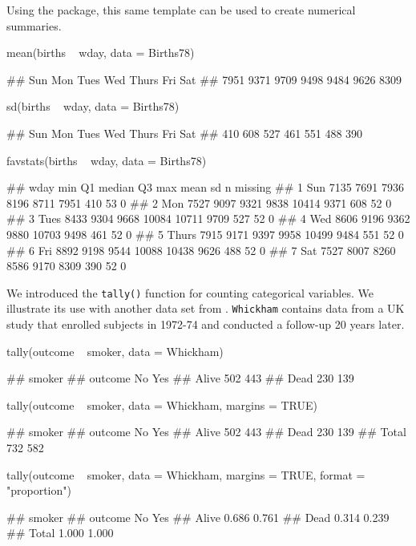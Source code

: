 \noindent
Using the  package, this same template can be used to create
numerical summaries.

\begin{Schunk}
\begin{Sinput}
mean(births ~ wday, data = Births78)
\end{Sinput}
\begin{Soutput}
##   Sun   Mon  Tues   Wed Thurs   Fri   Sat 
##  7951  9371  9709  9498  9484  9626  8309
\end{Soutput}
\begin{Sinput}
sd(births ~ wday, data = Births78)
\end{Sinput}
\begin{Soutput}
##   Sun   Mon  Tues   Wed Thurs   Fri   Sat 
##   410   608   527   461   551   488   390
\end{Soutput}
\begin{Sinput}
favstats(births ~ wday, data = Births78)
\end{Sinput}
\begin{Soutput}
##    wday  min   Q1 median    Q3   max mean  sd  n missing
## 1   Sun 7135 7691   7936  8196  8711 7951 410 53       0
## 2   Mon 7527 9097   9321  9838 10414 9371 608 52       0
## 3  Tues 8433 9304   9668 10084 10711 9709 527 52       0
## 4   Wed 8606 9196   9362  9880 10703 9498 461 52       0
## 5 Thurs 7915 9171   9397  9958 10499 9484 551 52       0
## 6   Fri 8892 9198   9544 10088 10438 9626 488 52       0
## 7   Sat 7527 8007   8260  8586  9170 8309 390 52       0
\end{Soutput}
\end{Schunk}

\noindent
We introduced the \texttt{tally()} function for counting categorical
variables. We illustrate its use with another data set from
 \citep{mosaicData}. \texttt{Whickham} contains data
from a UK study that enrolled subjects in 1972-74 and conducted a
follow-up 20 years later.

\begin{Schunk}
\begin{Sinput}
tally(outcome ~ smoker, data = Whickham)
\end{Sinput}
\begin{Soutput}
##        smoker
## outcome  No Yes
##   Alive 502 443
##   Dead  230 139
\end{Soutput}
\begin{Sinput}
tally(outcome ~ smoker, data = Whickham, margins = TRUE)
\end{Sinput}
\begin{Soutput}
##        smoker
## outcome  No Yes
##   Alive 502 443
##   Dead  230 139
##   Total 732 582
\end{Soutput}
\begin{Sinput}
tally(outcome ~ smoker, data = Whickham, margins = TRUE, format = "proportion")
\end{Sinput}
\begin{Soutput}
##        smoker
## outcome    No   Yes
##   Alive 0.686 0.761
##   Dead  0.314 0.239
##   Total 1.000 1.000
\end{Soutput}
\end{Schunk}

